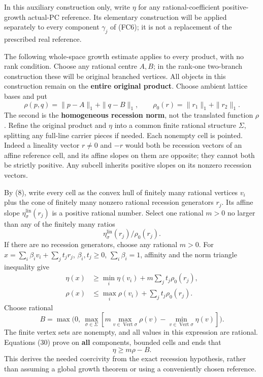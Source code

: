 \documentclass[
  11pt,
]{article}
\begin{document}
In this auxiliary construction only, write \(\eta\) for any
rational-coefficient positive-growth actual-PC reference. Its elementary
construction will be applied separately to every component \(\gamma_j\)
of (FC6); it is not a replacement of the prescribed real reference.

The following whole-space growth estimate applies to every product, with
no rank condition. Choose any rational centre \(A,B\); in the rank-one
two-branch construction these will be original branched vertices. All
objects in this construction remain on the \textbf{entire original
product}. Choose ambient lattice bases and put \[
\rho(p,q)=\|p-A\|_1+\|q-B\|_1,\qquad
\rho_0(r)=\|r_1\|_1+\|r_2\|_1.                               \tag{28}
\] The second is the \textbf{homogeneous recession norm}, not the
translated function \(\rho\). Refine the original product and \(\eta\)
into a common finite rational structure \(\Sigma\), splitting any
full-line carrier pieces if needed. Each nonempty cell is pointed.
Indeed a lineality vector \(r\ne0\) and \(-r\) would both be recession
vectors of an affine reference cell, and its affine slopes on them are
opposite; they cannot both be strictly positive. Any subcell inherits
positive slopes on its nonzero recession vectors.

By (8), write every cell as the convex hull of finitely many rational
vertices \(v_i\) plus the cone of finitely many nonzero rational
recession generators \(r_j\). Its affine slope
\(\eta_\sigma^{\mathrm{lin}}(r_j)\) is a positive rational number.
Select one rational \(m>0\) no larger than any of the finitely many
ratios \[
       \eta_\sigma^{\mathrm{lin}}(r_j)/\rho_0(r_j).            \tag{29}
\] If there are no recession generators, choose any rational \(m>0\).
For \(x=\sum_i\beta_iv_i+\sum_jt_jr_j\), \(\beta_i,t_j\geq0\),
\(\sum_i\beta_i=1\), affinity and the norm triangle inequality give \[
\begin{split}
\eta(x)&\geq\min_i\eta(v_i)+m\sum_jt_j\rho_0(r_j),\\
\rho(x)&\leq\max_i\rho(v_i)+\sum_jt_j\rho_0(r_j).
\end{split}                                                        \tag{30}
\] Choose rational \[
B=\max\bigl(0,\ \max_{\sigma\in\Sigma}
                 [m\max_{v\in\operatorname{Vert}\sigma}\rho(v)
                        -\min_{v\in\operatorname{Vert}\sigma}\eta(v)]\bigr).
\] The finite vertex sets are nonempty, and all values in this
expression are rational. Equations (30) prove on \textbf{all}
components, bounded cells and ends that \[
                         \eta\geq m\rho-B.                 \tag{31}
\] This derives the needed coercivity from the exact recession
hypothesis, rather than assuming a global growth theorem or using a
conveniently chosen reference.
\end{document}
